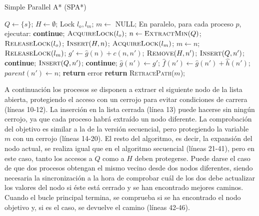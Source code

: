 \documentclass[a4paper,12pt]{article}
\begin{document}
\begin{algorithm}[H]
\begin{algorithmic}[1]
\caption{Simple Parallel A* (SPA*)}\label{spastar}
\State $Q \gets \{s\}$;
\State $H \gets \emptyset$;
\State Lock $l_o, l_m$;
\State $m \gets$ NULL;
\State En paralelo, para cada proceso $p$, ejecutar:
        \State \textbf{continue};
    \EndIf
    \State $\textsc{AcquireLock}(l_o)$;
    \State $n \gets \textsc{ExtractMin}(Q)$;
    \State $\textsc{ReleaseLock}(l_o)$;
    \State $\textsc{Insert}(H, n)$;
        \State $\textsc{AcquireLock}(l_m)$;
            \State $m \gets n$;
        \EndIf
        \State $\textsc{ReleaseLock}(l_m)$;
    \EndIf
        \State $g' \gets \hat{g}(n)+c(n, n')$;
                \State $\textsc{Remove}(H,n')$;
                \State $\textsc{Insert}(Q, n')$;
            \Else
                \State \textbf{continue};
            \EndIf
        \Else
                \State $\textsc{Insert}(Q,n')$;
                \State \textbf{continue};
            \EndIf
        \EndIf
        \State $\hat{g}(n') \gets g'$;
        \State $\hat{f}(n') \gets \hat{g}(n') + \hat{h}(n')$;
        \State $parent(n') \gets n$;
    \EndFor
\EndWhile
{}
    \State \textbf{return} error
\Else
    \State \textbf{return} \textsc{RetracePath}($m$);
\EndIf
\end{algorithmic}
\end{algorithm}

A continuación los procesos se disponen a extraer el siguiente nodo de la lista abierta, protegiendo el acceso con un cerrojo para evitar condiciones de carrera (líneas 10-12). La inserción en la lista cerrada (línea 13) puede hacerse sin ningún cerrojo, ya que cada proceso habrá extraído un nodo diferente. La comprobación del objetivo es similar a la de la versión secuencial, pero protegiendo la variable $m$ con un cerrojo (líneas 14-20). El resto del algoritmo, es decir, la expansión del nodo actual, se realiza igual que en el algoritmo secuencial (líneas 21-41), pero en este caso, tanto los accesos a $Q$ como a $H$ deben protegerse. Puede darse el caso de que dos procesos obtengan el mismo vecino desde dos nodos diferentes, siendo necesaria la sincronización a la hora de comprobar cuál de los dos debe actualizar los valores del nodo si éste está cerrado y se han encontrado mejores caminos. Cuando el bucle principal termina, se comprueba si se ha encontrado el nodo objetivo y, si es el caso, se devuelve el camino (líneas 42-46).
\end{document}
